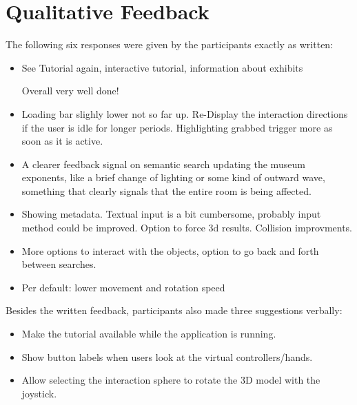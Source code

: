 \section{Qualitative Feedback}

The following six responses were given by the participants exactly as written:

\begin{itemize}[leftmargin=*]
  \item See Tutorial again, interactive tutorial, information about exhibits

  Overall very well done!
  \item Loading bar slighly lower not so far up. Re-Display the interaction directions if the user is idle for longer periods. Highlighting grabbed trigger more as soon as it is active.
  \item A clearer feedback signal on semantic search updating the museum exponents, like a brief change of lighting or some kind of outward wave, something that clearly signals that the entire room is being affected.
  \item Showing metadata. Textual input is a bit cumbersome, probably input method could be improved. Option to force 3d results. Collision improvments.
  \item More options to interact with the objects, option to go back and forth between searches.
  \item Per default: lower movement and rotation speed
\end{itemize}

Besides the written feedback, participants also made three suggestions verbally:

\begin{itemize}[leftmargin=*]
  \item Make the tutorial available while the application is running.
  \item Show button labels when users look at the virtual controllers/hands.
  \item Allow selecting the interaction sphere to rotate the 3D model with the joystick.
\end{itemize}

\endgroup
